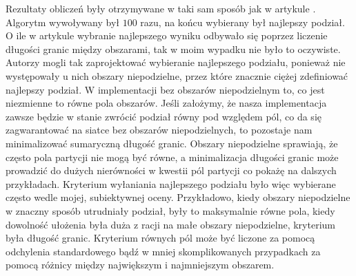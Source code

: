 Rezultaty obliczeń były otrzymywane w taki sam sposób jak w artykule \cite{1364754}.
Algorytm wywoływany był $100$ razu, na końcu wybierany był najlepszy podział.
O ile w artykule \cite{1364754} wybranie najlepszego wyniku odbywało się poprzez liczenie długości granic między obszarami,
tak w moim wypadku nie było to oczywiste.
Autorzy \cite{1364754} mogli tak zaprojektować wybieranie najlepszego podziału, ponieważ nie występowały u nich
obszary niepodzielne, przez które znacznie ciężej zdefiniować najlepszy podział.
W implementacji bez obszarów niepodzielnym to, co jest niezmienne to równe pola obszarów.
Jeśli założymy, że nasza implementacja zawsze będzie w stanie zwrócić podział równy pod względem pól,
co da się zagwarantować na siatce bez obszarów niepodzielnych, to pozostaje nam minimalizować sumaryczną długość granic.
Obszary niepodzielne sprawiają, że często pola partycji nie mogą być równe, a minimalizacja długości granic może
prowadzić do dużych nierówności w kwestii pól partycji co pokażę na dalszych przykładach.
Kryterium wyłaniania najlepszego podziału było więc wybierane często wedle mojej, subiektywnej oceny.
Przykładowo, kiedy obszary niepodzielne w znaczny sposób utrudniały podział, były to maksymalnie równe pola,
kiedy dowolność ułożenia była duża z racji na małe obszary niepodzielne, kryterium była długość granic.
Kryterium równych pól może być liczone za pomocą odchylenia standardowego bądź w mniej skomplikowanych przypadkach
za pomocą różnicy między największym i najmniejszym obszarem.